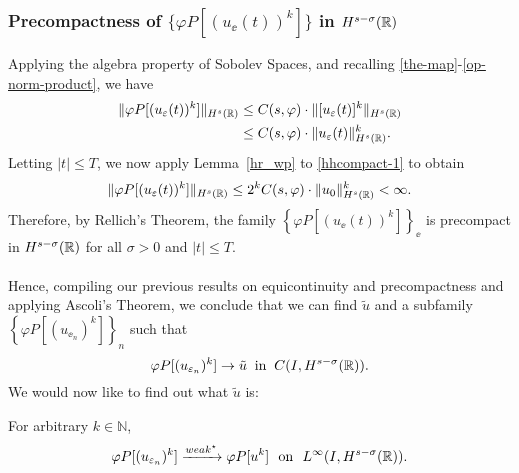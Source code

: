 \subsubsection{Precompactness of $\{\varphi P [(u_\ee(t))^k]\}$ in
$H^{s-\sigma  }(\mathbb{R})$}
Applying the algebra property of Sobolev
Spaces, and recalling \eqref{the-map}-\eqref{op-norm-product}, we have
\begin{equation}
\begin{split}
\label{hhcompact-1}
\|\varphi P [(u_\varepsilon(t))^k]\|_{H^{s}(\mathbb{R})}
& \le  C(s, \varphi) \cdot \|[u_\varepsilon(t)]^k\|_{H^{s}(\mathbb{R})}
\\
& \le C(s, \varphi) \cdot \|u_\varepsilon(t)\|^k_{H^{s}(\mathbb{R})}.
\end{split}
\end{equation}
%
Letting $|t| \le T$, we now apply Lemma~\ref{hr_wp} to
\eqref{hhcompact-1} to obtain
\begin{equation*}
\begin{split}
\|\varphi P [(u_\varepsilon(t))^k]\|_{H^{s}(\mathbb{R})}
\le 2^k C(s, \varphi) \cdot  \|u_0 \|^k_{H^s(\mathbb{R})} < \infty.
\end{split}
\end{equation*}
Therefore, by Rellich's Theorem, the family $\left\{
\varphi P [(u_\ee(t))^k] \right\}_\ee$ is
precompact in $H^{s- \sigma }(\mathbb{R})$ for all $\sigma > 0$ and $|t| \le T$. 
\\
\\
Hence, compiling our previous results on equicontinuity and precompactness
and applying Ascoli's Theorem, we
conclude that we can find $\tilde{u}$ and a subfamily 
\\ $\left\{
\varphi P [(u_{\ee_n})^k]
\right\}_n$ such that
\begin{equation}
\label{hhstrong-conv-of-u_ep}
\varphi P [(u_{\varepsilon_n})^k] \to \tilde{u}
\; \; \text{in} \; \; C(I, H^{s-\sigma}(\mathbb{R})).
\end{equation}
%
%
We would now like to find out what $\tilde{u}$ is:
%
%
%
\begin{lemma}
\label{hhlem:crit-conv}
For arbitrary $k \in \mathbb{N}$,
\begin{equation}
\begin{split}
\varphi P [(u_{\varepsilon_n})^k] \xrightarrow{weak^{\star}}
\varphi P [u^k] \ \ \text{on} \ \ L^\infty(I,
H^{s-\sigma}(\mathbb{R})).
\label{hhcrit-conv-est}
\end{split}
\end{equation}
\end{lemma}
